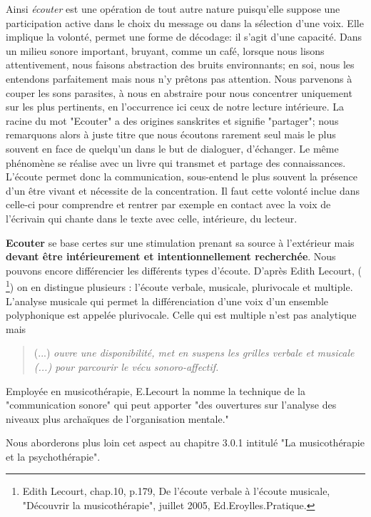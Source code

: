 Ainsi \emph{écouter} est une opération de tout autre nature
puisqu'elle suppose une participation active dans le choix du message
ou dans la sélection d'une voix. Elle  implique la volonté,
permet une forme de décodage: il s'agit d'une capacité. Dans un milieu sonore important, bruyant, comme un café, lorsque nous lisons attentivement, nous faisons abstraction
des bruits environnants; en soi, nous les entendons parfaitement mais nous n'y
prêtons pas attention. Nous parvenons à couper les sons parasites, à nous en abstraire pour
nous concentrer uniquement sur les plus  pertinents, en l'occurrence ici ceux de notre lecture intérieure.
 La racine du mot "Ecouter" a des origines sanskrites et signifie "partager"; nous remarquons alors à juste titre que nous écoutons rarement seul mais  le plus souvent en face de quelqu'un dans le but de dialoguer, d'échanger. Le même phénomène se réalise avec un livre qui transmet et partage des connaissances. L'écoute permet donc la communication, sous-entend le plus souvent la présence d'un être vivant et nécessite de la  concentration. Il faut cette volonté inclue dans celle-ci  pour comprendre et rentrer par exemple en contact avec la voix de  l'écrivain qui chante dans le texte avec celle, intérieure,  du lecteur.

 





\textbf{Ecouter} se base certes sur une stimulation prenant sa source à
l'extérieur mais \textbf{devant être intérieurement et  intentionnellement
	recherchée}.
Nous pouvons encore différencier les différents types d'écoute. D'après Edith Lecourt, ( \footnote{ Edith Lecourt, chap.10, p.179,  De l'écoute verbale à l'écoute musicale, "Découvrir la musicothérapie", juillet 2005, Ed.Eroylles.Pratique.}) on en distingue plusieurs : l'écoute verbale, musicale, plurivocale et multiple.
 L'analyse musicale qui permet la différenciation d'une voix d'un ensemble polyphonique est appelée plurivocale. Celle qui est multiple n'est pas analytique  mais \begin{quote}
 	 (...) \textit{ouvre une disponibilité, met en suspens les grilles verbale et musicale (...) pour parcourir le vécu sonoro-affectif.	}
 \end{quote}
 Employée en musicothérapie, E.Lecourt la nomme  la technique de la  "communication sonore" qui peut apporter 
 "des ouvertures sur l'analyse des niveaux plus archaïques de l'organisation mentale."	

 Nous aborderons plus loin cet aspect au chapitre 3.0.1 intitulé "La musicothérapie et la psychothérapie".




